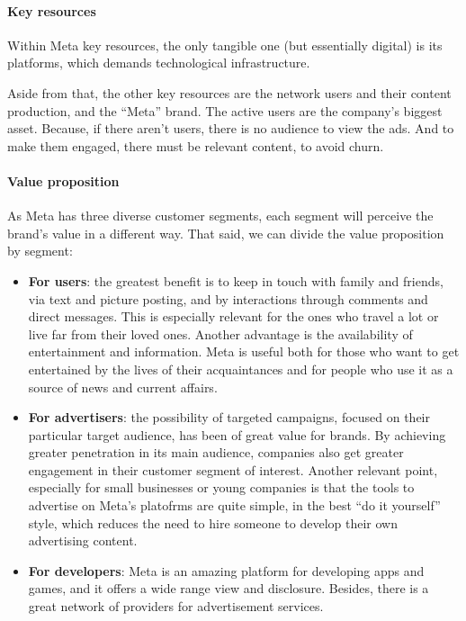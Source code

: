 \paragraph{Key resources}
Within Meta key resources, the only tangible one (but essentially
digital) is its platforms, which demands technological infrastructure.

Aside from that, the other key resources are the network users and
their content production, and the ``Meta'' brand. The active users are
the company's biggest asset. Because, if there aren't users, there is
no audience to view the ads. And to make them engaged, there must be
relevant content, to avoid churn.

\paragraph{Value proposition}
As Meta has three diverse customer segments, each segment will
perceive the brand's value in a different way. That said, we can
divide the value proposition by segment:

\begin{itemize}
\item \textbf{For users}: the greatest benefit is to keep in touch
  with family and friends, via text and picture posting, and by
  interactions through comments and direct messages. This is
  especially relevant for the ones who travel a lot or live far from
  their loved ones. Another advantage is the availability of
  entertainment and information. Meta is useful both for those who
  want to get entertained by the lives of their acquaintances and for
  people who use it as a source of news and current affairs.

\item \textbf{For advertisers}: the possibility of targeted campaigns,
  focused on their particular target audience, has been of great value
  for brands. By achieving greater penetration in its main audience,
  companies also get greater engagement in their customer segment of
  interest. Another relevant point, especially for small businesses or
  young companies is that the tools to advertise on Meta's platofrms
  are quite simple, in the best ``do it yourself'' style, which
  reduces the need to hire someone to develop their own advertising
  content.

\item \textbf{For developers}: Meta is an amazing platform for
  developing apps and games, and it offers a wide range view and
  disclosure. Besides, there is a great network of providers for
  advertisement services.
\end{itemize}

